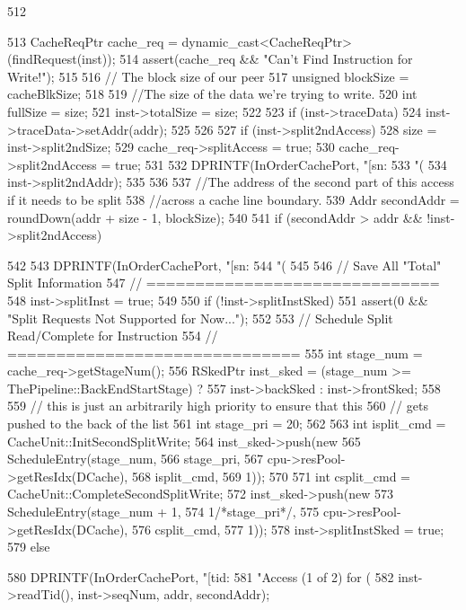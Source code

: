 \begin{DoxyCode}
512 {
513     CacheReqPtr cache_req = dynamic_cast<CacheReqPtr>(findRequest(inst));
514     assert(cache_req && "Can't Find Instruction for Write!");
515 
516     // The block size of our peer
517     unsigned blockSize = cacheBlkSize;
518 
519     //The size of the data we're trying to write.
520     int fullSize = size;
521     inst->totalSize = size;
522 
523     if (inst->traceData) {
524         inst->traceData->setAddr(addr);
525     }
526 
527     if (inst->split2ndAccess) {     
528         size = inst->split2ndSize;
529         cache_req->splitAccess = true;        
530         cache_req->split2ndAccess = true;
531         
532         DPRINTF(InOrderCachePort, "[sn:%
533                 "(%
534                 inst->split2ndAddr);
535     }  
536 
537     //The address of the second part of this access if it needs to be split
538     //across a cache line boundary.
539     Addr secondAddr = roundDown(addr + size - 1, blockSize);
540 
541     if (secondAddr > addr && !inst->split2ndAccess) {
542             
543         DPRINTF(InOrderCachePort, "[sn:%
544                 "(%
545 
546         // Save All "Total" Split Information
547         // ==============================
548         inst->splitInst = true;        
549 
550         if (!inst->splitInstSked) {
551             assert(0 && "Split Requests Not Supported for Now...");
552 
553             // Schedule Split Read/Complete for Instruction
554             // ==============================
555             int stage_num = cache_req->getStageNum();
556             RSkedPtr inst_sked = (stage_num >= ThePipeline::BackEndStartStage) ?
557                 inst->backSked : inst->frontSked;
558         
559             // this is just an arbitrarily high priority to ensure that this
560             // gets pushed to the back of the list
561             int stage_pri = 20;
562         
563             int isplit_cmd = CacheUnit::InitSecondSplitWrite;
564             inst_sked->push(new
565                             ScheduleEntry(stage_num,
566                                           stage_pri,
567                                           cpu->resPool->getResIdx(DCache),
568                                           isplit_cmd,
569                                           1));
570 
571             int csplit_cmd = CacheUnit::CompleteSecondSplitWrite;
572             inst_sked->push(new
573                             ScheduleEntry(stage_num + 1,
574                                           1/*stage_pri*/,
575                                           cpu->resPool->getResIdx(DCache),
576                                           csplit_cmd,
577                                           1));
578             inst->splitInstSked = true;
579         } else {
580             DPRINTF(InOrderCachePort, "[tid:%
581                     "Access (1 of 2) for (%
582                     inst->readTid(), inst->seqNum, addr, secondAddr);            
             
}}}
\end{DoxyCode}
